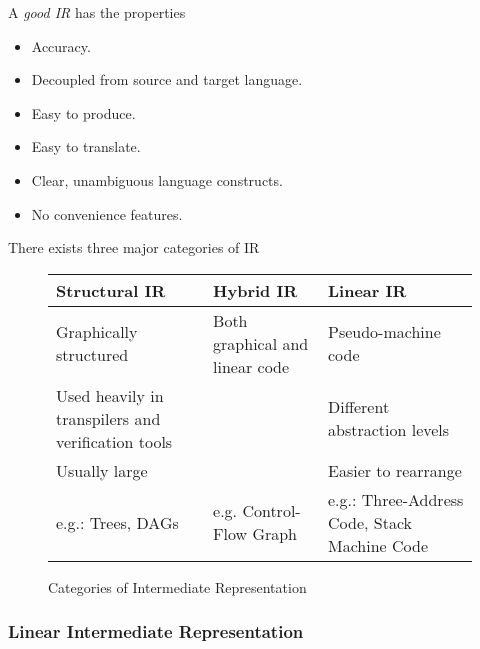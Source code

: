 \begin{definition}
    A \textit{good IR} has the properties
    \begin{itemize}
        \item Accuracy.
        \item Decoupled from source and target language.
        \item Easy to produce.
        \item Easy to translate.
        \item Clear, unambiguous language constructs.
        \item No convenience features.
    \end{itemize}
\end{definition}

\begin{definition}[IR Categories]
    There exists three major categories of IR
    \begin{figure}[H]
        \centering
        \begin{tabularx}{\textwidth}{@{} X X X @{}}
            \toprule
            Structural IR & Hybrid IR & Linear IR \\
            \midrule
            Graphically structured & Both graphical and linear code & Pseudo-machine code \\
            Used heavily in transpilers and verification tools & & Different abstraction levels \\
            Usually large & & Easier to rearrange \\
            \midrule
            e.g.: Trees, DAGs & e.g. Control-Flow Graph & e.g.: Three-Address Code, Stack Machine Code \\
            \bottomrule
        \end{tabularx}
        \caption{Categories of Intermediate Representation}
        \label{fig:ir-categories}
    \end{figure}
\end{definition}

\subsubsection{Linear Intermediate Representation}

